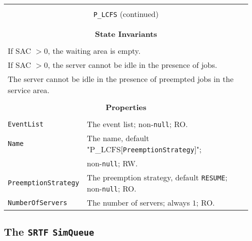 \documentclass[12pt]{book}
\begin{document}
\begin{tabular}{|l|l|l|}
\hline
\multicolumn{3}{|c|}{} \\
\multicolumn{3}{|c|}{\lstinline[basicstyle=\large]{P_LCFS} (continued)} \\
\multicolumn{3}{|c|}{} \\
\hline
\multicolumn{3}{|c|}{} \\
\multicolumn{3}{|c|}{\bf State  Invariants} \\
\multicolumn{3}{|c|}{} \\
\hline
\multicolumn{3}{|l|}{If SAC $> 0$, the waiting area is empty.} \\
\multicolumn{3}{|l|}{If SAC $> 0$, the server cannot be idle in the presence of jobs.} \\
\multicolumn{3}{|l|}{The server cannot be idle in the presence of preempted jobs in the service area.} \\
\hline
\multicolumn{3}{|c|}{} \\
\multicolumn{3}{|c|}{\bf Properties} \\
\multicolumn{3}{|c|}{} \\
\hline
\lstinline|EventList|          & \multicolumn{2}{|l|}{The event list; non-\lstinline|null|; RO.} \\
\hline
\lstinline|Name|               & \multicolumn{2}{|l|}{The name, default "P\_LCFS[\lstinline|PreemptionStrategy|]";} \\
                               & \multicolumn{2}{|l|}{non-\lstinline|null|; RW.} \\
\hline
\lstinline|PreemptionStrategy| & \multicolumn{2}{|l|}{The preemption strategy, default \lstinline|RESUME|;
                                                      non-\lstinline|null|; RO.} \\
\hline
\lstinline|NumberOfServers|    & \multicolumn{2}{|l|}{The number of servers; always $1$; RO.} \\
\hline
\end{tabular}

\subsection{The \lstinline{SRTF} \lstinline{SimQueue}}
\end{document}
